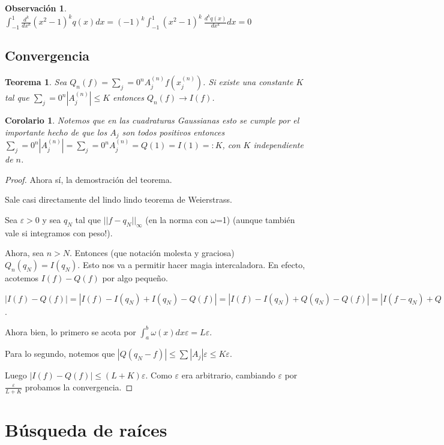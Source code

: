 \documentclass[10pt,a4paper,final]{report}
\newtheorem{theorem}{Teorema}
\newtheorem{observation}{Observación}
\newtheorem{corollary}{Corolario}
\begin{document}
{\begin{observation}
	$\int_{-1}^1 \frac{d^k}{dx^k}(x^2-1)^k q(x) dx = (-1)^k \int_{-1}^1 (x^2-1)^k\ \frac{d^k q(x)}{dx^k}dx=0$
\end{observation}

\subsection{Convergencia}
\begin{theorem}
	Sea $Q_n(f) = \displaystyle \sum_j=0^n A_j^{(n)} f(x_j^{(n)})$. Si existe una constante $K$ tal que $\displaystyle \sum_j=0^n |A_j^{(n)}|\leq K$ entonces $Q_n(f) \to I(f)$.
\end{theorem}

\begin{corollary}
	Notemos que en las cuadraturas Gaussianas esto se cumple por el importante hecho de que los $A_j$ son todos positivos entonces $\displaystyle \sum_j=0^n |A_j^{(n)}| = \displaystyle \sum_j=0^n A_j^{(n)} = Q(1) = I(1) =: K$, con $K$ independiente de $n$.
\end{corollary}

\begin{proof}
	Ahora sí, la demostración del teorema.
	
	Sale casi directamente del lindo lindo teorema de Weierstrass.
	
	Sea $\varepsilon > 0$ y sea $q_N$ tal que $||f-q_N||_\infty$ (en la norma con $\omega$=1) (aunque también vale si integramos con peso!).
	
	Ahora, sea $n> N$. Entonces (que notación molesta y graciosa) $Q_n(q_N) = I(q_N)$. Esto nos va a permitir hacer magia intercaladora. En efecto, acotemos $I(f)-Q(f)$ por algo pequeño.
	
	$|I(f)-Q(f)|=|I(f)-I(q_N) + I(q_N) - Q(f)|=|I(f)-I(q_N) + Q(q_N) - Q(f)|=|I(f-q_N)+ Q(q_N-f)|\leq |I(f-q_N)| + |Q(q_N-f)|$.
	
	Ahora bien, lo primero se acota por $\int_a^b \omega(x)dx \varepsilon= L \varepsilon$.
	
	Para lo segundo, notemos que $|Q(q_N-f)| \leq \displaystyle \sum |A_j| \varepsilon \leq K \varepsilon$.
	
	Luego $|I(f)-Q(f)| \leq (L+K)\varepsilon$. Como $\varepsilon$ era arbitrario, cambiando $\varepsilon$ por $\frac{\varepsilon}{L+K}$ probamos la convergencia.
\end{proof}

\section{Búsqueda de raíces}

}
\end{document}
